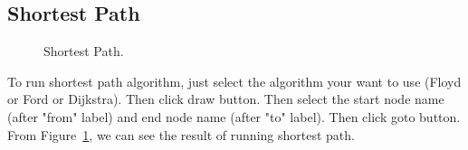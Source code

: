 \documentclass{article}
\begin{document}
\subsection{Shortest Path}
\begin{figure}[htb]
\centering
{}
   \caption{Shortest Path.}
    \label{fig:shortest path}
\end{figure}
To run shortest path algorithm, just select the algorithm your want to use (Floyd or Ford or Dijkstra). Then click draw button. Then select the start node name (after "from" label) and end node name (after "to" label). Then click goto button. From Figure~\ref{fig:shortest path}, we can see the result of running shortest path.\\ 
 
\end{document}
